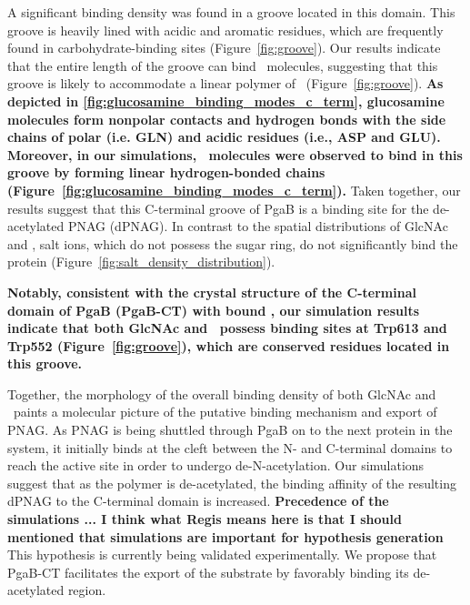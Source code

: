 {A significant binding density was found in a groove located in this domain.  This groove is heavily lined with acidic and aromatic residues, which are frequently found in carbohydrate-binding sites (Figure~\ref{fig:groove}). Our results indicate that the entire length of the groove can bind \glucosamine\ molecules, suggesting that this groove is likely to accommodate a linear polymer of \glucosamine\ (Figure~\ref{fig:groove}). \textbf{As depicted in \ref{fig:glucosamine_binding_modes_c_term}, glucosamine molecules form nonpolar contacts and hydrogen bonds with the side chains of polar (i.e. GLN) and acidic residues (i.e., ASP and GLU).  Moreover, in our simulations, \glucosamine\ molecules were observed to bind in this groove by forming linear hydrogen-bonded chains (Figure~\ref{fig:glucosamine_binding_modes_c_term}).} Taken together, our results suggest that this C-terminal groove of PgaB is a binding site for the de-acetylated PNAG (dPNAG). In contrast to the spatial distributions of GlcNAc and \glucosamine, salt ions, which do not possess the sugar ring, do not significantly bind the protein (Figure~\ref{fig:salt_density_distribution}).

\textbf{Notably, consistent with the crystal structure of the C-terminal domain of PgaB (PgaB-CT) with bound \glucosamine, our simulation results indicate that both GlcNAc and \glucosamine\ possess binding sites at Trp613 and Trp552 (Figure~\ref{fig:groove}), which are conserved residues located in this groove.\cite{Little:2012dp}}

Together, the morphology of the overall binding density of both GlcNAc and \glucosamine\ paints a molecular picture of the putative binding mechanism and export of PNAG. As PNAG is being shuttled through PgaB on to the next protein in the system, it initially binds at the cleft between the N- and C-terminal domains to reach the active site in order to undergo de-N-acetylation. Our simulations suggest that as the polymer is de-acetylated, the binding affinity of the resulting dPNAG to the C-terminal domain is increased. \textbf{Precedence of the simulations ... I think what Regis means here is that I should mentioned that simulations are important for hypothesis generation} This hypothesis is currently being validated experimentally. We propose that PgaB-CT facilitates the export of the substrate by favorably binding its de-acetylated region. 

 
}
